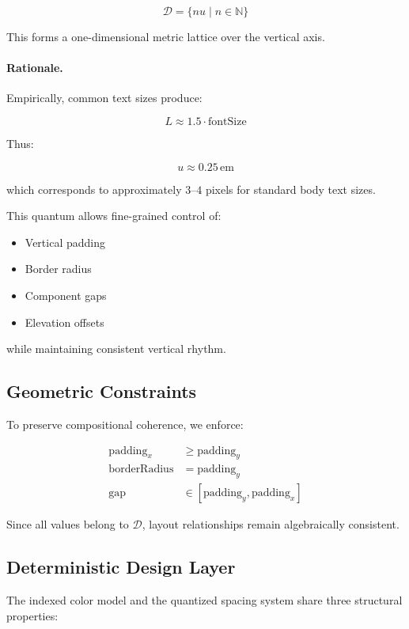 \[
\mathcal{D} = \{ n u \mid n \in \mathbb{N} \}
\]

This forms a one-dimensional metric lattice over the vertical axis.

\paragraph{Rationale.}

Empirically, common text sizes produce:

\[
L \approx 1.5 \cdot \text{fontSize}
\]

Thus:

\[
u \approx 0.25\,\text{em}
\]

which corresponds to approximately $3$–$4$ pixels
for standard body text sizes.

This quantum allows fine-grained control of:

\begin{itemize}
    \item Vertical padding
    \item Border radius
    \item Component gaps
    \item Elevation offsets
\end{itemize}

while maintaining consistent vertical rhythm.

\subsection{Geometric Constraints}

To preserve compositional coherence, we enforce:

\begin{align}
\text{padding}_x &\geq \text{padding}_y \\
\text{borderRadius} &= \text{padding}_y \\
\text{gap} &\in [\text{padding}_y, \text{padding}_x]
\end{align}

Since all values belong to $\mathcal{D}$,
layout relationships remain algebraically consistent.

\subsection{Deterministic Design Layer}

The indexed color model and the quantized spacing system
share three structural properties:

